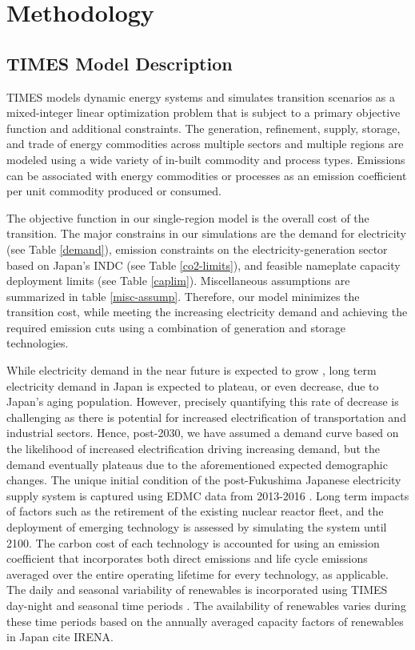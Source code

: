 \section{Methodology} \label{method}
\subsection{TIMES Model Description}
\gls{TIMES} models dynamic energy systems and simulates transition scenarios as a mixed-integer linear optimization problem that is subject to a primary objective function and additional constraints. The generation, refinement, supply, storage, and trade of energy commodities across multiple sectors and multiple regions are modeled using a wide variety of in-built commodity and process types. Emissions can be associated with energy commodities or processes as an emission coefficient per unit commodity produced or consumed. 

The objective function in our single-region model is the overall cost of the transition. The major constrains in our simulations are the demand for electricity (see Table \ref{demand}), emission constraints on the electricity-generation sector based on Japan's \gls{INDC} (see Table \ref{co2-limits}), and feasible nameplate capacity deployment limits (see Table \ref{caplim}). Miscellaneous assumptions are summarized in table \ref{misc-assump}. Therefore, our model minimizes the transition cost, while meeting the increasing electricity demand and achieving the required emission cuts using a combination of generation and storage technologies. 

While electricity demand in the near future is expected to grow \cite{the_federation_of_electric_power_companies_of_japan_electricity_2019}, long term electricity demand in Japan is expected to plateau, or even decrease, due to Japan's aging population. However, precisely quantifying this rate of decrease is challenging as there is potential for increased electrification of  transportation and industrial sectors. Hence, post-2030, we have assumed a demand curve based on the likelihood of increased electrification driving increasing demand, but the demand eventually plateaus due to the aforementioned expected demographic changes. The unique initial condition of the post-Fukushima Japanese electricity supply system is captured using \gls{EDMC} data from 2013-2016 \cite{the_institute_of_energy_economics_japan_energy_2018}. Long term impacts of factors such as the retirement of the existing nuclear reactor fleet, and the deployment of emerging technology is assessed by simulating the system until 2100. The carbon cost of each technology is accounted for using an emission coefficient that incorporates both direct emissions and life cycle emissions averaged over the entire operating lifetime for every technology, as applicable. The daily and seasonal variability of renewables is incorporated using \gls{TIMES} day-night and seasonal time periods \cite{loulou_etsap-tiam_2008}. The availability of renewables varies during these time periods based on the annually averaged capacity factors of renewables in Japan \cite{the_institute_of_energy_economics_japan_energy_2018} cite IRENA.

